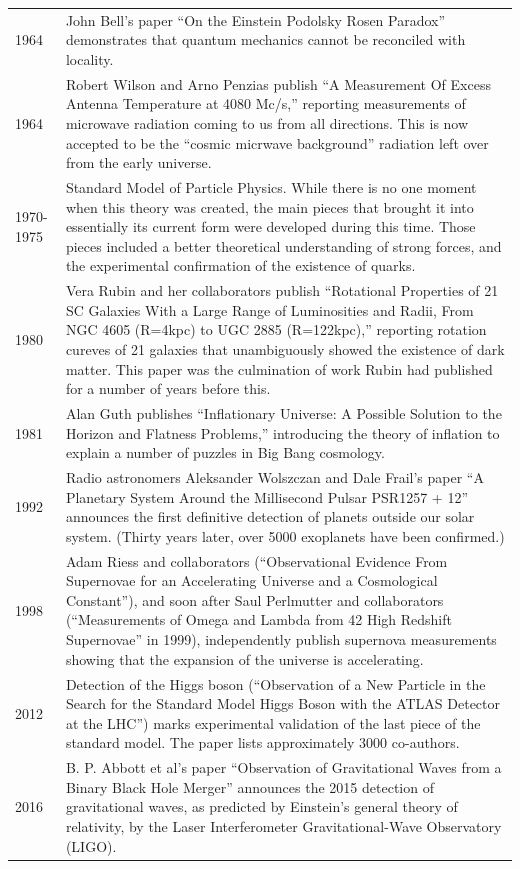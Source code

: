 \documentclass[../../main.tex]{subfiles}
\begin{document}
\begin{center}
\begin{longtable}{p{}  p{}}
1964&John Bell's paper “On the Einstein Podolsky Rosen Paradox” demonstrates that quantum mechanics cannot be reconciled with locality.\\
1964&Robert Wilson and Arno Penzias publish “A Measurement Of Excess Antenna Temperature at 4080 Mc/s,” reporting measurements of microwave radiation coming to us from all directions. This is now accepted to be the “cosmic micrwave background” radiation left over from the early universe.\\
1970-1975&Standard Model of Particle Physics. While there is no one moment when this theory was created, the main pieces that brought it into essentially its current form were developed during this time. Those pieces included a better theoretical understanding of strong forces, and the experimental confirmation of the existence of quarks.\\
1980&Vera Rubin and her collaborators publish “Rotational Properties of 21 SC Galaxies With a Large Range of Luminosities and Radii, From NGC
4605 (R=4kpc) to UGC 2885 (R=122kpc),” reporting rotation cureves of 21 galaxies that unambiguously showed the existence of dark matter. This paper was the culmination of work Rubin had published for a number of years before this.\\
1981&Alan Guth publishes “Inflationary Universe: A Possible Solution to the Horizon and Flatness Problems,” introducing the theory of inflation to explain a number of puzzles in Big Bang cosmology.\\
1992&Radio astronomers Aleksander Wolszczan and Dale Frail's paper “A Planetary System Around the Millisecond Pulsar PSR1257 + 12” announces the first definitive detection of planets outside our solar system. (Thirty years later, over 5000 exoplanets have been confirmed.) \\
1998&Adam Riess and collaborators (“Observational Evidence From Supernovae for an Accelerating Universe and a Cosmological Constant”), and soon after Saul Perlmutter and collaborators (“Measurements of Omega
and Lambda from 42 High Redshift Supernovae” in 1999), independently publish supernova measurements showing that the expansion of the universe is accelerating.\\
2012&Detection of the Higgs boson (“Observation of a New Particle in the Search for the Standard Model Higgs Boson with the ATLAS Detector at the LHC”) marks experimental validation of the last piece of the standard model. The paper lists approximately 3000 co-authors.\\
2016&B. P. Abbott et al's paper “Observation of Gravitational Waves from a Binary Black Hole Merger” announces the 2015  detection of gravitational waves, as predicted by Einstein's general theory of relativity, by the Laser Interferometer Gravitational-Wave Observatory (LIGO).\\

\end{longtable}
\end{center}
\end{document}
